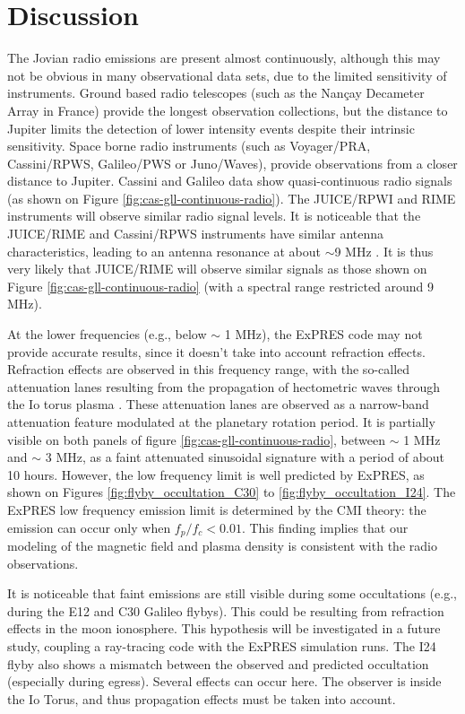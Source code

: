 \documentclass[referee]{aa}
\begin{document}
\section{Discussion} %
\label{sec:Discussion}

The Jovian radio emissions are present almost continuously, although this may not be obvious in many observational data sets, due to the limited sensitivity of instruments. Ground based radio telescopes (such as the Nan\c cay Decameter Array in France) provide the longest observation collections, but the distance to Jupiter limits the detection of lower intensity events despite their intrinsic sensitivity. Space borne radio instruments (such as Voyager/PRA, Cassini/RPWS, Galileo/PWS or Juno/Waves), provide observations from a closer distance to Jupiter. Cassini and Galileo data show quasi-continuous radio signals (as shown on Figure \ref{fig:cas-gll-continuous-radio}). The JUICE/RPWI and RIME instruments will observe similar radio signal levels. It is noticeable that the JUICE/RIME and Cassini/RPWS instruments have similar antenna characteristics, leading to an antenna resonance at about $\sim$9 MHz \citep{zarka_JGR_04, Bruzzone:2013ge}. It is thus very likely that JUICE/RIME will observe similar signals as those shown on Figure \ref{fig:cas-gll-continuous-radio} (with a spectral range restricted around 9 MHz). 

At the lower frequencies (e.g., below $\sim$ 1 MHz), the ExPRES code may not provide accurate results, since it doesn't take into account refraction effects. Refraction effects are observed in this frequency range, with the so-called attenuation lanes \citep{gurnett_GRL_98a} resulting from the propagation of hectometric waves through the Io torus plasma \citep{menietti_PSS_03}. These attenuation lanes are observed as a  narrow-band attenuation feature modulated at the planetary rotation period. It is partially visible on both panels of figure \ref{fig:cas-gll-continuous-radio}, between $\sim$ 1 MHz and $\sim$ 3 MHz, as a faint attenuated sinusoidal signature with a period of about 10 hours. However, the low frequency limit is well predicted by ExPRES, as shown on Figures \ref{fig:flyby_occultation_C30} to \ref{fig:flyby_occultation_I24}. The ExPRES low frequency emission limit is determined by the CMI theory: the emission can occur only when $f_p/f_c < 0.01$. This finding implies that our modeling of the magnetic field and plasma density is consistent with the radio observations. 

It is noticeable that faint emissions are still visible during some occultations (e.g., during the E12 and C30 Galileo flybys). This could be resulting from refraction effects in the moon ionosphere. This hypothesis will be investigated in a future study, coupling a ray-tracing code \citep{Gautier:2013uh} with the ExPRES simulation runs. The I24 flyby also shows a mismatch between the observed and predicted occultation (especially during egress). Several effects can occur here. The observer is inside the Io Torus, and thus propagation effects must be taken into account. 
\end{document}
